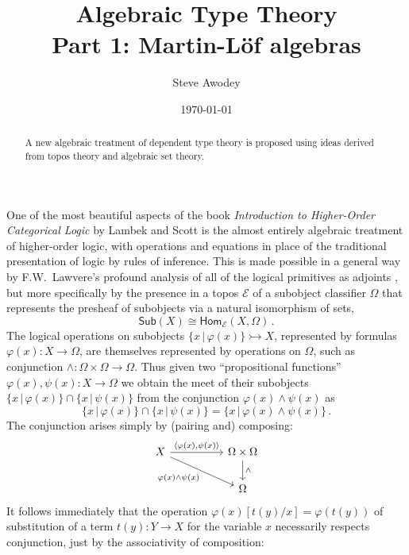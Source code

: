 \documentclass[12pt,reqno]{amsart}
\newcommand{\EE}{\ensuremath{\mathcal{E}}}
\newcommand{\Hom}{\ensuremath{\mathsf{Hom}}}
\newcommand{\mono}{\ensuremath{\rightarrowtail}}
\renewcommand{\to}{\ensuremath{\rightarrow}}
\theoremstyle{remark}
\theoremstyle{definition}
\begin{document}

\title{Algebraic Type Theory\\
Part 1: {M}artin-{L}\"of algebras}
\author{Steve Awodey}
\date{\today}

\begin{abstract}
A new algebraic treatment of dependent type theory is proposed using ideas derived from topos theory and algebraic set theory.
\end{abstract}
\maketitle

One of the most beautiful aspects of the book \emph{Introduction to Higher-Order Categorical Logic} by Lambek and Scott is the almost entirely algebraic treatment of higher-order logic, with operations and equations in place of the traditional presentation of logic by rules of inference.   This is made possible in a general way by F.W.\ Lawvere's profound analysis of all of the logical primitives as adjoints \cite{Lawvere:adjointness}, but more specifically by the presence in a topos $\EE$ of a subobject classifier $\Omega$ that represents the presheaf of subobjects via a natural isomorphism of sets,
\[
\mathsf{Sub}(X) \cong \Hom_{\EE}(X, \Omega)\,.
\]
The logical operations on subobjects $\{x\,|\, \varphi(x)\} \mono X$, represented by formulas $\varphi(x) : X \to \Omega$, are themselves represented by operations on $\Omega$, such as conjunction $\wedge : \Omega \times \Omega \to \Omega$.  Thus given two ``propositional functions'' $\varphi(x), \psi(x) : X \to \Omega$ we obtain the meet of their subobjects $\{x\,|\, \varphi(x)\}\cap \{x\,|\, \psi(x)\}$ from the conjunction $\varphi(x)\wedge\psi(x)$ as 
\[
\{x\,|\, \varphi(x)\}\cap \{x\,|\, \psi(x)\} = \{x\,|\, \varphi(x) \wedge \psi(x)\} \,.
\]
The conjunction arises simply by (pairing and) composing:
\begin{equation*}
\begin{tikzcd}
 X \ar[rr, "{\langle \varphi(x), \psi(x) \rangle}" ] \ar[rrd,swap,  "\varphi(x)\wedge\psi(x)"] && \Omega \times \Omega \ar[d, "\wedge"] \\
 && \Omega 
\end{tikzcd}
\end{equation*}
It follows immediately that the operation $\varphi(x)[t(y)/x] = \varphi(t(y))$ of substitution of a term $t(y) : Y\to X$ for the variable $x$ necessarily respects conjunction, just by the associativity of composition:
\end{document}
